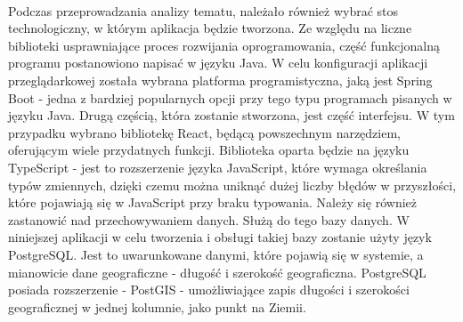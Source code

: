 \paragraph{}
Podczas przeprowadzania analizy tematu, należało również wybrać stos technologiczny, w którym aplikacja będzie tworzona. Ze względu na liczne biblioteki usprawniające proces rozwijania oprogramowania, część funkcjonalną programu postanowiono napisać w języku Java. W celu konfiguracji aplikacji przeglądarkowej została wybrana platforma programistyczna, jaką jest Spring Boot - jedna z bardziej popularnych opcji przy tego typu programach pisanych w języku Java. Drugą częścią, która zostanie stworzona, jest część interfejsu. W tym przypadku wybrano bibliotekę React, będącą powszechnym narzędziem, oferującym wiele przydatnych funkcji. Biblioteka oparta będzie na języku TypeScript - jest to rozszerzenie języka JavaScript, które wymaga określania typów zmiennych, dzięki czemu można uniknąć dużej liczby błędów w przyszłości, które pojawiają się w JavaScript przy braku typowania. Należy się również zastanowić nad przechowywaniem danych. Służą do tego bazy danych. W niniejszej aplikacji w celu tworzenia i obsługi takiej bazy zostanie użyty język PostgreSQL. Jest to uwarunkowane danymi, które pojawią się w systemie, a mianowicie dane geograficzne - długość i szerokość geograficzna. PostgreSQL posiada rozszerzenie - PostGIS - umożliwiające zapis długości i szerokości geograficznej w jednej kolumnie, jako punkt na Ziemii.




